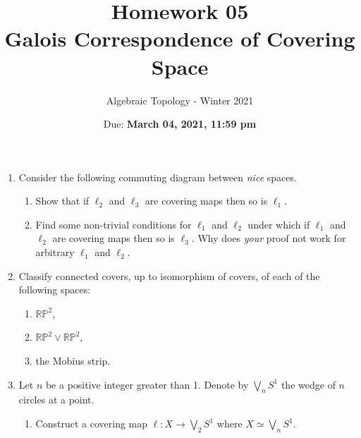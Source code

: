 \documentclass{article}
\title{Homework 05 \\ Galois Correspondence of Covering Space}
\author{Algebraic Topology - Winter 2021}
\date{Due: \textbf{March 04, 2021, 11:59 pm}}
\begin{document}
\maketitle

\begin{enumerate}
\item 
  Consider the following commuting diagram between \emph{nice} spaces.
  \begin{center}
  \end{center}
  \begin{enumerate}
  \item Show that if $\ell_2$ and $\ell_3$ are covering maps then so is $\ell_1$. 
  \item Find some non-trivial conditions for $\ell_1$ and $\ell_2$ under which if $\ell_1$ and $\ell_2$ are covering
    maps then so is $\ell_3$. Why does \textit{your} proof not work for
    arbitrary $\ell_1$ and $\ell_2$.
  \end{enumerate}
\item Classify connected covers, up to isomorphism of covers, of each of the following
  spaces:
  \begin{enumerate}
  \item $\mathbb{RP}^2$,
  \item $\mathbb{RP}^2 \vee \mathbb{RP}^2$,
  \item the Mobius strip.
  \end{enumerate}
\item
  Let $n$ be a positive integer greater than 1. Denote by $\bigvee
  _{n}S^1$ the wedge of $n$ circles at a point. 
  \begin{enumerate}
  \item Construct a covering map $\ell: X \to \bigvee _2 S^1$ where $X \simeq \bigvee _n S^1$.

\end{enumerate}
\end{enumerate}
\end{document}
